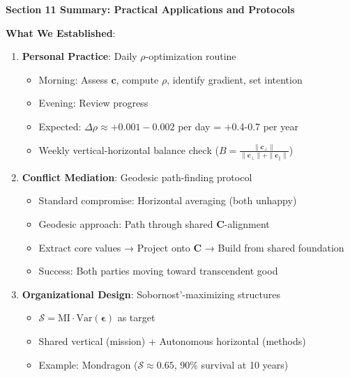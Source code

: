 \documentclass[11pt,a4paper]{article}
\theoremstyle{definition}
\theoremstyle{remark}
\newcommand{\cc}{\mathbf{c}}
\begin{document}
\begin{small}
\begin{enumerate}
\begin{mdframed}[backgroundcolor=green!10,linewidth=2pt,linecolor=green!70!black]
\textbf{Section 11 Summary: Practical Applications and Protocols}

\textbf{What We Established}:
\begin{enumerate}[nosep]
    \item \textbf{Personal Practice}: Daily \(\rho\)-optimization routine
        \begin{itemize}[nosep]
            \item Morning: Assess \(\cc\), compute \(\rho\), identify gradient, set intention
            \item Evening: Review progress
            \item Expected: \(\Delta\rho \approx +0.001-0.002\) per day = +0.4-0.7 per year
            \item Weekly vertical-horizontal balance check (\(B = \frac{\|\cc_\perp\|}{\|\cc_\perp\| + \|\cc_\parallel\|}\))
        \end{itemize}
    
    \item \textbf{Conflict Mediation}: Geodesic path-finding protocol
        \begin{itemize}[nosep]
            \item Standard compromise: Horizontal averaging (both unhappy)
            \item Geodesic approach: Path through shared \(\mathbf{C}\)-alignment
            \item Extract core values → Project onto \(\mathbf{C}\) → Build from shared foundation
            \item Success: Both parties moving toward transcendent good
        \end{itemize}
    
    \item \textbf{Organizational Design}: Sobornost'-maximizing structures
        \begin{itemize}[nosep]
            \item \(\mathcal{S} = \text{MI} \cdot \text{Var}(\boldsymbol{\epsilon})\) as target
            \item Shared vertical (mission) + Autonomous horizontal (methods)
            \item Example: Mondragon (\(\mathcal{S} \approx 0.65\), 90\% survival at 10 years)
        \end{itemize}
    

\end{enumerate}
\end{mdframed}
\end{enumerate}
\end{small}
\end{document}
